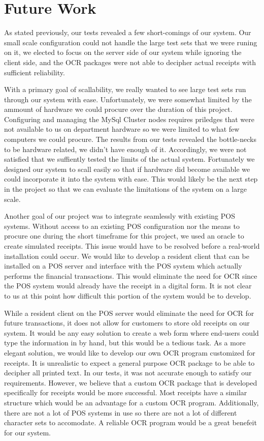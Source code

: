 \section{Future Work}
\label{sec:future}
As stated previously, our tests revealed a few short-comings of our system.  Our small scale configuration could not handle the large test sets that we were runing on it, we elected to focus on the server side of our system while ignoring the client side, and the OCR packages were not able to decipher actual receipts with sufficient reliability.

With a primary goal of scallability, we really wanted to see large test sets run through our system with ease.  Unfortunately, we were somewhat limited by the ammount of hardware we could procure over the duration of this project.  Configuring and managing the MySql Cluster nodes requires priledges that were not available to us on department hardware so we were limited to what few computers we could procure.  The results from our tests revealed the bottle-necks to be hardware related, we didn't have enough of it.  Accordingly, we were not satisfied that we suffiently tested the limits of the actual system.  Fortunately we designed our system to scall easily so that if hardware did become available we could incorporate it into the system with ease.  This would likely be the next step in the project so that we can evaluate the limitations of the system on a large scale.

Another goal of our project was to integrate seamlessly with existing POS systems.  Without access to an existing POS configuration nor the means to procure one during the short timeframe for this project, we used an oracle to create simulated receipts.  This issue would have to be resolved before a real-world installation could occur.  We would like to develop a resident client that can be installed on a POS server and interface with the POS system which actually performs the financial transactions.  This would eliminate the need for OCR since the POS system would already have the receipt in a digital form.  It is not clear to us at this point how difficult this portion of the system would be to develop.

While a resident client on the POS server would eliminate the need for OCR for future transactions, it does not allow for customers to store old receipts on our system.  It would be any easy solution to create a web form where end-users could type the information in by hand, but this would be a tedious task.  As a more elegant solution, we would like to develop our own OCR program customized for receipts.  It is unrealistic to expect a general purpose OCR package to be able to decipher all printed text.  In our tests, it was not accurate enough to satisfy our requirements.  However, we believe that a custom OCR package that is developed specifically for receipts would be more successful.  Most receipts have a similar structure which would be an advantage for a custom OCR program.  Additionally, there are not a lot of POS systems in use so there are not a lot of different character sets to accomodate.  A reliable OCR program would be a great benefeit for our system.
